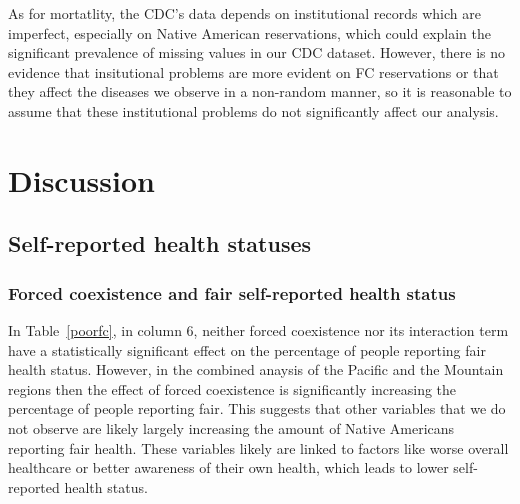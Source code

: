 \documentclass[12pt]{article}
\begin{document}
As for mortatlity, the CDC's data depends on institutional records which are imperfect, especially on Native American reservations, which could explain the significant prevalence of missing values in our CDC dataset.  However, there is no evidence that insitutional problems are more evident on FC reservations or that they affect the diseases we observe in a non-random manner, so it is reasonable to assume that these institutional problems do not significantly affect our analysis.


\section{Discussion}
\subsection{Self-reported health statuses}
\subsubsection{Forced coexistence and fair self-reported health status}
In Table~\ref{poorfc}, in column 6, neither forced coexistence nor its interaction term have a statistically significant effect on the percentage of people reporting fair health status.  However, in the combined anaysis of the Pacific and the Mountain regions then the effect of forced coexistence is significantly increasing the percentage of people reporting fair.  This suggests that other variables that we do not observe are likely largely increasing the amount of Native Americans reporting fair health.  These variables likely are linked to factors like worse overall healthcare or better awareness of their own health, which leads to lower self-reported health status.


\end{document}
